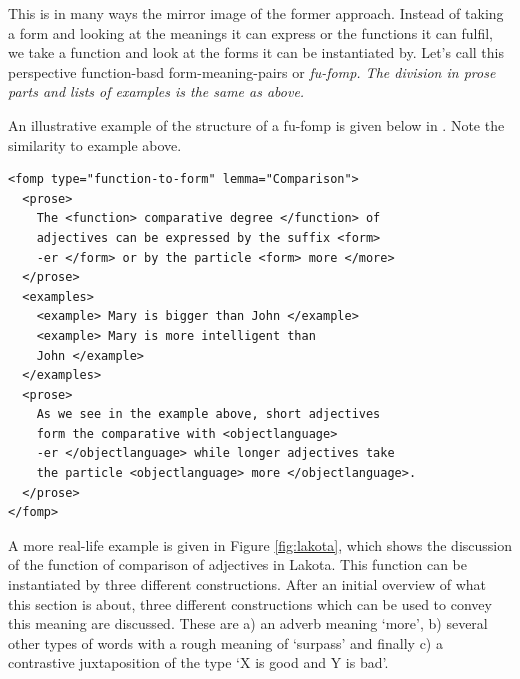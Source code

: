 \documentclass[a4paper,12pt]{article}
\begin{document}
This is in many ways the mirror image of the former approach. Instead of taking a form and looking at the meanings it can express or the functions it can fulfil, we take a function and look at the forms it can be instantiated by. Let's call this perspective function-basd form-meaning-pairs or \em fu-fomp\em. The division in prose parts and lists of examples is the same as above.

An illustrative example of the structure of a fu-fomp is given below in . Note the similarity to example  above.

\ea\label{xml:fufomp:intro}
\begin{verbatim}
<fomp type="function-to-form" lemma="Comparison">
  <prose>
    The <function> comparative degree </function> of
    adjectives can be expressed by the suffix <form>
    -er </form> or by the particle <form> more </more>
  </prose>
  <examples>
    <example> Mary is bigger than John </example>
    <example> Mary is more intelligent than
    John </example>
  </examples>
  <prose>
    As we see in the example above, short adjectives
    form the comparative with <objectlanguage>
    -er </objectlanguage> while longer adjectives take
    the particle <objectlanguage> more </objectlanguage>.
  </prose>
</fomp>
\end{verbatim}
\z




A more real-life example is given in Figure \ref{fig:lakota}, which shows the discussion of the function of comparison of adjectives in Lakota. This function can be instantiated by three different constructions. After an initial overview of what this section is about, three different constructions which can be used to convey this meaning are discussed. These are a) an adverb meaning `more', b) several other types of words with a rough meaning of `surpass' and finally c) a contrastive juxtaposition of the type `X is good and Y is bad'.
\end{document}
